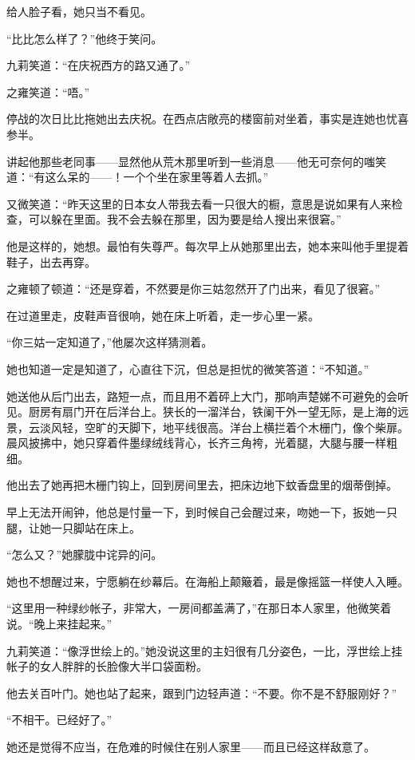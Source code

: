 \par 给人脸子看，她只当不看见。
\par “比比怎么样了？”他终于笑问。
\par 九莉笑道：“在庆祝西方的路又通了。”
\par 之雍笑道：“唔。”
\par 停战的次日比比拖她出去庆祝。在西点店敞亮的楼窗前对坐着，事实是连她也忧喜参半。
\par 讲起他那些老同事——显然他从荒木那里听到一些消息——他无可奈何的嗤笑道：“有这么呆的——！一个个坐在家里等着人去抓。”
\par 又微笑道：“昨天这里的日本女人带我去看一只很大的橱，意思是说如果有人来检查，可以躲在里面。我不会去躲在那里，因为要是给人搜出来很窘。”
\par 他是这样的，她想。最怕有失尊严。每次早上从她那里出去，她本来叫他手里提着鞋子，出去再穿。
\par 之雍顿了顿道：“还是穿着，不然要是你三姑忽然开了门出来，看见了很窘。”
\par 在过道里走，皮鞋声音很响，她在床上听着，走一步心里一紧。
\par “你三姑一定知道了，”他屡次这样猜测着。
\par 她也知道一定是知道了，心直往下沉，但总是担忧的微笑答道：“不知道。”
\par 她送他从后门出去，路短一点，而且用不着砰上大门，那响声楚娣不可避免的会听见。厨房有扇门开在后洋台上。狭长的一溜洋台，铁阑干外一望无际，是上海的远景，云淡风轻，空旷的天脚下，地平线很高。洋台上横拦着个木栅门，像个柴扉。晨风披拂中，她只穿着件墨绿绒线背心，长齐三角袴，光着腿，大腿与腰一样粗细。
\par 他出去了她再把木栅门钩上，回到房间里去，把床边地下蚊香盘里的烟蒂倒掉。
\par 早上无法开闹钟，他总是忖量一下，到时候自己会醒过来，吻她一下，扳她一只腿，让她一只脚站在床上。
\par “怎么又？”她朦胧中诧异的问。
\par 她也不想醒过来，宁愿躺在纱幕后。在海船上颠簸着，最是像摇篮一样使人入睡。
\par “这里用一种绿纱帐子，非常大，一房间都盖满了，”在那日本人家里，他微笑着说。“晚上来挂起来。”
\par 九莉笑道：“像浮世绘上的。”她没说这里的主妇很有几分姿色，一比，浮世绘上挂帐子的女人胖胖的长脸像大半口袋面粉。
\par 他去关百叶门。她也站了起来，跟到门边轻声道：“不要。你不是不舒服刚好？”
\par “不相干。已经好了。”
\par 她还是觉得不应当，在危难的时候住在别人家里——而且已经这样敌意了。
